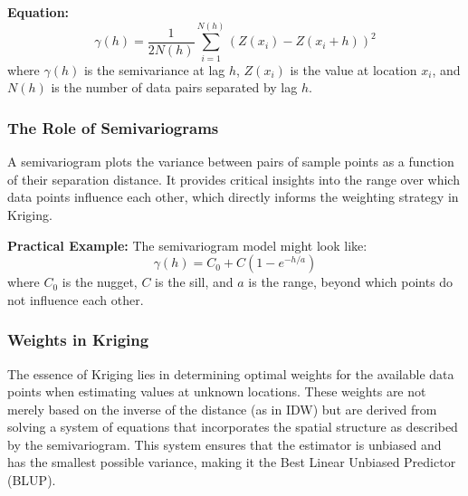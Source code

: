 \documentclass{article}
\begin{document}
\textbf{Equation:}
\[
\gamma(h) = \frac{1}{2N(h)} \sum_{i=1}^{N(h)} (Z(x_i) - Z(x_i + h))^2
\]
where \(\gamma(h)\) is the semivariance at lag \(h\), \(Z(x_i)\) is the value at location \(x_i\), and \(N(h)\) is the number of data pairs separated by lag \(h\).

\subsubsection{The Role of Semivariograms}
A semivariogram plots the variance between pairs of sample points as a function of their separation distance. It provides critical insights into the range over which data points influence each other, which directly informs the weighting strategy in Kriging.

\textbf{Practical Example:}
The semivariogram model might look like:
\[
\gamma(h) = C_0 + C(1 - e^{-h/a})
\]
where \(C_0\) is the nugget, \(C\) is the sill, and \(a\) is the range, beyond which points do not influence each other.

\subsubsection{Weights in Kriging}
The essence of Kriging lies in determining optimal weights for the available data points when estimating values at unknown locations. These weights are not merely based on the inverse of the distance (as in IDW) but are derived from solving a system of equations that incorporates the spatial structure as described by the semivariogram. This system ensures that the estimator is unbiased and has the smallest possible variance, making it the Best Linear Unbiased Predictor (BLUP).
\end{document}

